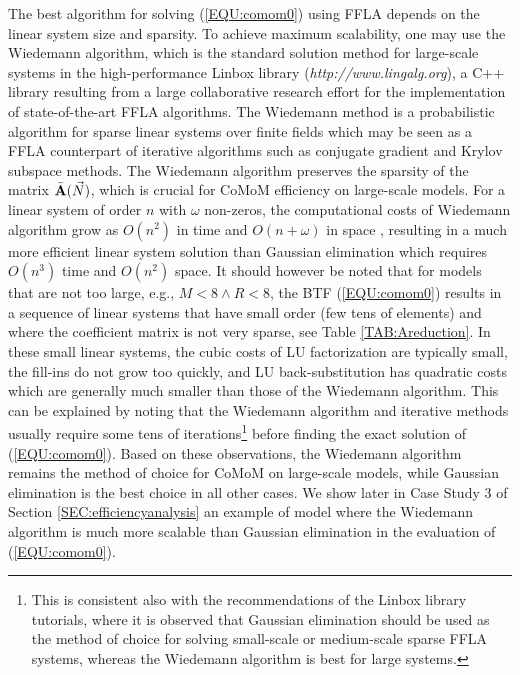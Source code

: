 \documentclass[journal,twocolumn,9.5pt]{IEEEtran}
\newcommand{\comom}[1]{\bar{#1}}
\begin{document}
The best algorithm for solving (\ref{EQU:comom0}) using FFLA depends on the linear system size and sparsity. To achieve maximum scalability, one may use the Wiedemann algorithm\cite{LaMO90}, which is the standard solution method for large-scale systems in the high-performance Linbox library ({\em http://www.lingalg.org}), a C++ library resulting from a large collaborative research effort for the implementation of state-of-the-art FFLA algorithms. The Wiedemann method is a probabilistic algorithm for sparse linear systems over finite fields which may be seen as a FFLA counterpart of iterative algorithms such as conjugate gradient and Krylov subspace methods\cite{LaMO90}. The Wiedemann algorithm preserves the sparsity of the matrix $\comom{\bf A}(\vec N)$, which is crucial for CoMoM efficiency on large-scale models. For a linear system of order $n$ with $\omega$ non-zeros, the computational costs of Wiedemann algorithm grow as $O(n^2)$ in time and $O(n+\omega)$ in space \cite{LaMO90}, resulting in a much more efficient linear system solution than Gaussian elimination which requires $O(n^3)$ time and $O(n^2)$ space.
It should however be noted that for models that are not too large, e.g., $M<8 \wedge R<8$, the BTF (\ref{EQU:comom0}) results in a sequence of linear systems that have small order (few tens of elements) and where the coefficient matrix is not very sparse, see Table \ref{TAB:Areduction}. In these small linear systems, the cubic costs of LU factorization are typically small, the fill-ins do not grow too quickly, and LU back-substitution has quadratic costs which are generally much smaller than those of the Wiedemann algorithm. This can be explained by noting that the Wiedemann algorithm and iterative methods usually require some tens of iterations\footnote{This is consistent also with the recommendations of the Linbox library tutorials, where it is observed that Gaussian elimination should be used as the method of choice for solving small-scale or medium-scale sparse FFLA systems, whereas the Wiedemann algorithm is best for large systems.} before finding the exact solution of (\ref{EQU:comom0}). Based on these observations, the Wiedemann algorithm remains the method of choice for CoMoM on large-scale models, while Gaussian elimination is the best choice in all other cases. We show later in Case Study 3 of Section \ref{SEC:efficiencyanalysis} an example of model where the Wiedemann algorithm is much more scalable than Gaussian elimination in the evaluation of (\ref{EQU:comom0}).
\end{document}
